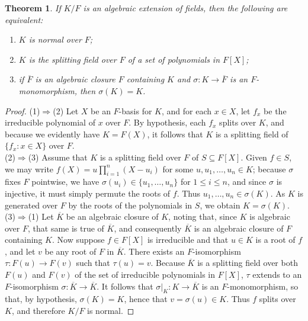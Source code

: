 \documentclass[12pt]{article}
\theoremstyle{plain}
\newtheorem*{thm*}{Theorem}
\newcommand{\set}[1]{\{#1\}}
\begin{document}
\begin{thm*}
If $K/F$ is an algebraic extension of fields, then the following are equivalent:
\begin{enumerate}
\item $K$ is normal over $F$;
\item $K$ is the splitting field over $F$ of a set of polynomials in $F[X]$;
\item if $\overline{F}$ is an algebraic closure $F$ containing $K$ and $\sigma:K\rightarrow\overline{F}$ is an $F$-monomorphism, then $\sigma(K)=K$.
\end{enumerate}
\end{thm*}
\begin{proof}
(1)$\Rightarrow$(2) Let $X$ be an $F$-basis for $K$, and for each $x\in X$, let $f_x$ be the irreducible polynomial of $x$ over $F$. By hypothesis, each $f_x$ splits over $K$, and because we evidently have $K=F(X)$, it follows that $K$ is a splitting field of $\set{f_x:x\in X}$ over $F$.\\
(2)$\Rightarrow$(3) Assume that $K$ is a splitting field over $F$ of $S\subseteq F[X]$. Given $f\in S$, we may write $f(X)=u\prod_{i=1}^n(X-u_i)$ for some $u,u_1,\ldots,u_n\in K$; because $\sigma$ fixes $F$ pointwise, we have $\sigma(u_i)\in\set{u_1,\ldots,u_n}$ for $1\leq i\leq n$, and since $\sigma$ is injective, it must simply permute the roots of $f$. Thus $u_1,\ldots,u_n\in\sigma(K)$. As $K$ is generated over $F$ by the roots of the polynomials in $S$, we obtain $K=\sigma(K)$.\\
(3)$\Rightarrow$(1) Let $\overline{K}$ be an algebraic closure of $K$, noting that, since $K$ is algebraic over $F$, that same is true of $\overline{K}$, and consequently $\overline{K}$ is an algebraic closure of $F$ containing $K$. Now suppose $f\in F[X]$ is irreducible and that $u\in K$ is a root of $f$, and let $v$ be any root of $F$ in $\overline{K}$. There exists an $F$-isomorphism $\tau:F(u)\rightarrow F(v)$ such that $\tau(u)=v$. Because $\overline{K}$ is a splitting field over both $F(u)$ and $F(v)$ of the set of irreducible polynomials in $F[X]$, $\tau$ extends to an $F$-isomorphism $\sigma:\overline{K}\rightarrow\overline{K}$. It follows that $\sigma\vert_K:K\rightarrow\overline{K}$ is an $F$-monomorphism, so that, by hypothesis, $\sigma(K)=K$, hence that $v=\sigma(u)\in K$. Thus $f$ splits over $K$, and therefore $K/F$ is normal.
\end{proof}
\end{document}
